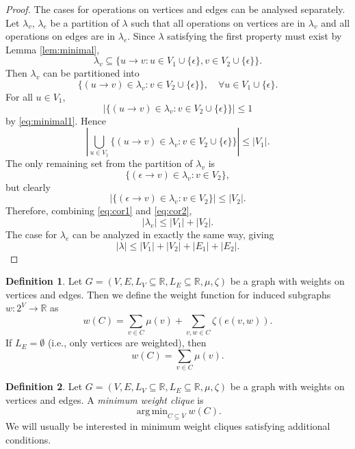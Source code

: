 \documentclass{article}
\DeclareMathOperator*{\argmin}{arg\,min}
\theoremstyle{definition}
\newtheorem{definition}{Definition}
\begin{document}
\begin{proof}
  The cases for operations on vertices and edges can be analysed separately. Let $\lambda_v$, $\lambda_e$ be a partition of $\lambda$ such that all operations on vertices are in $\lambda_v$ and all operations on edges are in $\lambda_e$. Since $\lambda$ satisfying the first property must exist by Lemma \ref{lem:minimal},
  \[ \lambda_v \subseteq \{ u \to v : u \in V_1 \cup \{ \epsilon \}, v \in V_2 \cup \{ \epsilon \} \} .\]
  Then $\lambda_v$ can be partitioned into
  \[ \{ (u \to v) \in \lambda_v : v \in V_2 \cup \{ \epsilon \} \}, \quad \forall u \in V_1 \cup \{ \epsilon \}. \]
  For all $u \in V_1$,
  \[ |\{ (u \to v) \in \lambda_v : v \in V_2 \cup \{ \epsilon \} \}| \le 1 \]
  by \eqref{eq:minimal1}. Hence
  \begin{equation} \label{eq:cor1}
    \left|\bigcup_{u \in V_1} \{ (u \to v) \in \lambda_v : v \in V_2 \cup \{ \epsilon \} \}\right| \le |V_1|.
  \end{equation}
  The only remaining set from the partition of $\lambda_v$ is
  \[ \{ (\epsilon \to v) \in \lambda_v : v \in V_2 \}, \]
  but clearly
  \begin{equation} \label{eq:cor2}
    |\{ (\epsilon \to v) \in \lambda_v : v \in V_2 \}| \le |V_2|.
  \end{equation}
  Therefore, combining \eqref{eq:cor1} and \eqref{eq:cor2},
  \[ |\lambda_v| \le |V_1| + |V_2|. \]
  The case for $\lambda_e$ can be analyzed in exactly the same way, giving
  \[ |\lambda| \le |V_1| + |V_2| + |E_1| + |E_2|. \]
\end{proof}
\begin{definition}
  Let $G = (V, E, L_V \subseteq \mathbb{R}, L_E \subseteq \mathbb{R}, \mu, \zeta)$ be a graph with weights on vertices and edges. Then we define the weight function for induced subgraphs $w: 2^V \to \mathbb{R}$ as
  \[ w(C) = \sum_{v \in C} \mu(v) + \sum_{v, w \in C} \zeta(e(v, w)). \]
  If $L_E = \emptyset$ (i.e., only vertices are weighted), then
  \[ w(C) = \sum_{v \in C} \mu(v). \]
\end{definition}
\begin{definition}
  Let $G = (V, E, L_V \subseteq \mathbb{R}, L_E \subseteq \mathbb{R}, \mu, \zeta)$ be a graph with weights on vertices and edges. A \emph{minimum weight clique} is
  \[ \argmin_{C \subseteq V} w(C). \]
  We will usually be interested in minimum weight cliques satisfying additional conditions.
\end{definition}
\end{document}
